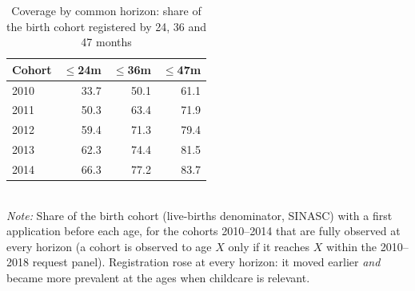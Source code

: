 \begin{table}[htbp]\centering
\caption{Coverage by common horizon: share of the birth cohort registered by 24, 36 and 47 months}
\label{tab:P5cov}
\footnotesize
\setlength{\tabcolsep}{4pt}
\begin{tabular}{lrrr}
\toprule
Cohort & $\le$24m & $\le$36m & $\le$47m \\
\midrule
2010 & 33.7 & 50.1 & 61.1 \\
2011 & 50.3 & 63.4 & 71.9 \\
2012 & 59.4 & 71.3 & 79.4 \\
2013 & 62.3 & 74.4 & 81.5 \\
2014 & 66.3 & 77.2 & 83.7 \\
\bottomrule
\end{tabular}
\\[3pt]{\footnotesize \textit{Note:} Share of the birth cohort (live-births denominator, SINASC) with a first application before each age, for the cohorts 2010--2014 that are fully observed at every horizon (a cohort is observed to age $X$ only if it reaches $X$ within the 2010--2018 request panel). Registration rose at every horizon: it moved earlier \emph{and} became more prevalent at the ages when childcare is relevant.}
\end{table}
